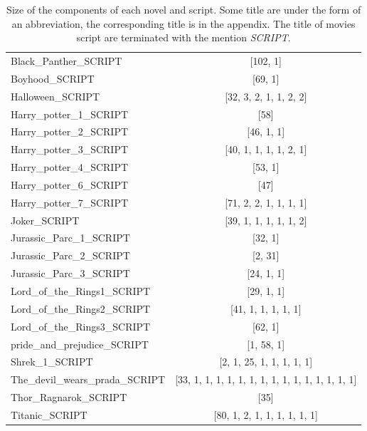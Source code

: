 \documentclass[a4paper, 12pt]{report}
\begin{document}
\begin{table}
{\begin{tabular}{|l|c|}
Black\_Panther\_SCRIPT        & {[}102, 1{]}                     \\
Boyhood\_SCRIPT               & {[}69, 1{]}                      \\
Halloween\_SCRIPT             & {[}32, 3, 2, 1, 1, 2, 2{]}       \\
Harry\_potter\_1\_SCRIPT      & {[}58{]}                         \\
Harry\_potter\_2\_SCRIPT      & {[}46, 1, 1{]}                   \\
Harry\_potter\_3\_SCRIPT      & {[}40, 1, 1, 1, 1, 2, 1{]}       \\
Harry\_potter\_4\_SCRIPT      & {[}53, 1{]}                      \\
Harry\_potter\_6\_SCRIPT      & {[}47{]}                         \\
Harry\_potter\_7\_SCRIPT      & {[}71, 2, 2, 1, 1, 1, 1{]}       \\
Joker\_SCRIPT                 & {[}39, 1, 1, 1, 1, 1, 2{]}       \\
Jurassic\_Parc\_1\_SCRIPT     & {[}32, 1{]}                      \\
Jurassic\_Parc\_2\_SCRIPT     & {[}2, 31{]}                      \\
Jurassic\_Parc\_3\_SCRIPT     & {[}24, 1, 1{]}                   \\
Lord\_of\_the\_Rings1\_SCRIPT & {[}29, 1, 1{]}                   \\
Lord\_of\_the\_Rings2\_SCRIPT    & {[}41, 1, 1, 1, 1, 1{]}                                                          \\
Lord\_of\_the\_Rings3\_SCRIPT & {[}62, 1{]}                      \\
pride\_and\_prejudice\_SCRIPT & {[}1, 58, 1{]}                   \\
Shrek\_1\_SCRIPT              & {[}2, 1, 25, 1, 1, 1, 1, 1{]}    \\
The\_devil\_wears\_prada\_SCRIPT & {[}33, 1, 1, 1, 1, 1, 1, 1, 1, 1, 1, 1, 1, 1, 1, 1{]}                            \\
Thor\_Ragnarok\_SCRIPT        & {[}35{]}                         \\
Titanic\_SCRIPT               & {[}80, 1, 2, 1, 1, 1, 1, 1, 1{]}\\
\hline
\end{tabular}}
\caption{Size of the components of each novel and script. Some title are under the form of an abbreviation, the corresponding title
 is in the appendix. The title of movies script are terminated with the mention \textit{SCRIPT}.}
 \label{components}
\end{table}
\end{document}
